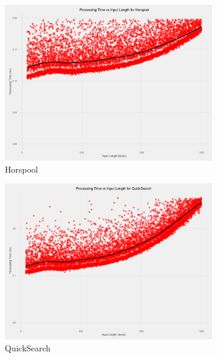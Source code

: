 \documentclass[11pt]{article}
\begin{document}
\begin{figure}[!htb]
  \centering
  \begin{subfigure}[b]{0.48\textwidth}
      \includegraphics[width=\textwidth]{images/processing_speed_vs_input_length_no_matches_Horspool}
      \caption{Horspool}
  \end{subfigure}
  \begin{subfigure}[b]{0.48\textwidth}
      \includegraphics[width=\textwidth]{images/processing_speed_vs_input_length_no_matches_QuickSearch}
      \caption{QuickSearch}
  \end{subfigure}
  ~
  \begin{subfigure}[b]{0.48\textwidth}

\end{subfigure}
\end{figure}
\end{document}
